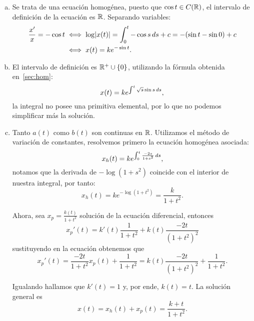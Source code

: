 \documentclass[../ecuaciones_diferenciales.tex]{subfiles}
\begin{document}
\begin{solution}
	\begin{enumerate}[(a), wide, labelwidth=0pt, labelindent=0pt]
		\item Se trata de una ecuación homogénea, puesto que
		      \(\cos t \in C(\mathbb{R})\), el intervalo de definición de la ecuación es
		      \(\mathbb{R}\). Separando variables:
		      \begin{align*}
			      \frac{x'}{x} = -\cos t & \iff
			      \log\abs{x(t)} = \int_0^t -\cos s \dif s + c
			      = -(\sin t - \sin 0) + c                            \\
			                             & \iff x(t) = k e^{-\sin t}.
		      \end{align*}

		\item El intervalo de definición es \(\R^+ \cup \set{0}\), utilizando la
		      fórmula obtenida en~\ref{sec:hom}:
		      \[x(t) = k e^{\int^t \sqrt{s} \sin s \mathop{d\!} s},\]
		      la integral no posee una primitiva elemental, por lo que no podemos
		      simplificar más la solución.

		\item Tanto \(a(t)\) como \(b(t)\) son continuas en \(\mathbb{R}\). Utilizamos
		      el método de variación de constantes, resolvemos primero la ecuación
		      homogénea asociada:
		      \[x_h(t) = k e^{\int_0^t \frac{-2s}{1 + s^2} \mathop{d\!} s},\]
		      notamos que la derivada de \(-\log(1 + s^2)\) coincide con el
		      interior de nuestra integral, por tanto:
		      \[x_h(t) = k e^{-\log(1 + t^2)} = \frac{k}{1 + t^2}.\]

		      Ahora, sea \(x_p = \frac{k(t)}{1 + t^2}\) solución de la ecuación
		      diferencial, entonces
		      \[x_p'(t) = k'(t)\frac{1}{1 + t^2} + k(t)\frac{-2t}{{(1 + t^2)}^2}\]
		      sustituyendo en la ecuación obtenemos que
		      \[x_p'(t) = \frac{-2t}{1 + t^2} x_p(t) + \frac{1}{1 + t^2}
			      = k(t)\frac{-2t}{{(1 + t^2)}^2}  + \frac{1}{1 + t^2}.\]

		      Igualando hallamos que \(k'(t) = 1\) y, por ende, \(k(t) = t\).
		      La solución general es
		      \[x(t) = x_h(t) + x_p(t) = \frac{k + t}{1 + t^2}.\]


\end{enumerate}
\end{solution}
\end{document}
